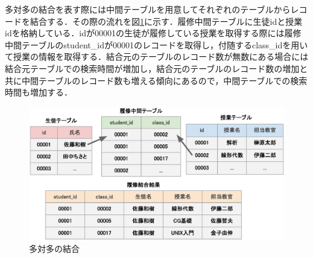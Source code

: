 \documentclass[a4paper,11pt]{ujreport}
\begin{document}
多対多の結合を表す際には中間テーブルを用意してそれぞれのテーブルからレコードを結合する．その際の流れを図\ref{figure:MvDescription2}に示す．履修中間テーブルに生徒idと授業idを格納している．idが00001の生徒が履修している授業を取得する際には履修中間テーブルのstudent\_idが00001のレコードを取得し，付随するclass\_idを用いて授業の情報を取得する．結合元のテーブルのレコード数が無数にある場合には結合元テーブルでの検索時間が増加し，結合元のテーブルのレコード数の増加と共に中間テーブルのレコード数も増える傾向にあるので，中間テーブルでの検索時間も増加する．
\begin{figure}[htbp]
	\begin{center}
		\includegraphics[width=32em, trim=0 5em 0 0]{src/MvDescription2.eps} %
	\end{center}
	\caption{多対多の結合}
	\label{figure:MvDescription2}
\end{figure}
\end{document}
